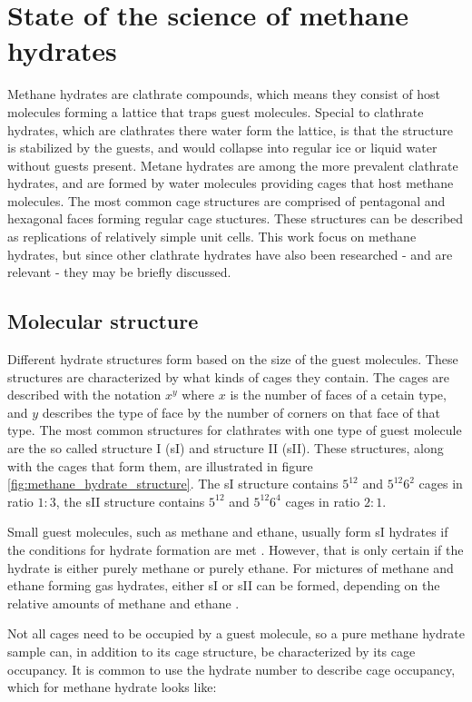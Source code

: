 \chapter{State of the science of methane hydrates}
\label{ch:state_of_the_science}
Methane hydrates are clathrate compounds, which means they consist of host molecules forming a lattice that traps guest molecules. Special to clathrate hydrates, which are clathrates there water form the lattice, is that the structure is stabilized by the guests, and would collapse into regular ice or liquid water without guests present. Metane hydrates are among the more prevalent clathrate hydrates, and are formed by water molecules providing cages that host methane molecules. The most common cage structures are comprised of pentagonal and hexagonal faces forming regular cage stuctures. These structures can be described as replications of relatively simple unit cells. This work focus on methane hydrates, but since other clathrate hydrates have also been researched - and are relevant - they may be briefly discussed.


\section{Molecular structure}
Different hydrate structures form based on the size of the guest molecules. These structures are characterized by what kinds of cages they contain. The cages are described with the notation $x^y$ where $x$ is the number of faces of a cetain type, and $y$ describes the type of face by the number of corners on that face of that type. The most common structures for clathrates with one type of guest molecule are the so called structure I (sI) and structure II (sII). These structures, along with the cages that form them, are illustrated in figure \ref{fig:methane_hydrate_structure}. The sI structure contains $5^{12}$ and $5^{12}6^2$ cages in ratio $1:3$, the sII structure contains $5^{12}$ and $5^{12}6^4$ cages in ratio $2:1$.  

Small guest molecules, such as methane and ethane, usually form sI hydrates if the conditions for hydrate formation are met \cite{Hester2009}. However, that is only certain if the hydrate is either purely methane or purely ethane. For mictures of methane and ethane forming gas hydrates, either sI or sII can be formed, depending on the relative amounts of methane and ethane \cite{Subramanian20001981}. 

Not all cages need to be occupied by a guest molecule, so a pure methane hydrate sample can, in addition to its cage structure, be characterized by its cage occupancy. It is common to use the hydrate number to describe cage occupancy, which for methane hydrate looks like:

